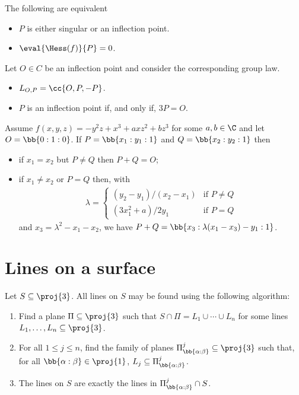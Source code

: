 \documentclass{article}
\begin{document}
\begin{lemma}
  The following are equivalent
  \begin{itemize}
    \item $P$ is either singular or an inflection point.
    \item $\eval{\Hess(f)}{P} = 0$.
  \end{itemize}
\end{lemma}

\begin{lemma}
  Let $O\in C$ be an inflection point and consider the corresponding
  group law.
  \begin{itemize}
    \item $L_{O,P} = \cc{O,P,-P}$.
    \item $P$ is an inflection point if, and only if, $3P=O$.
  \end{itemize}
\end{lemma}

\begin{lemma}
  Assume $f(x,y,z) = -y^2z + x^3 + axz^2 + bz^3$ for some $a,b\in\C$
  and let $O=\bb{0:1:0}$. If $P=\bb{x_1:y_1:1}$ and $Q=\bb{x_2:y_2:1}$
  then
  \begin{itemize}
    \item if $x_1=x_2$ but $P\neq Q$ then $P+Q=O$;
    \item if $x_1\neq x_2$ or $P=Q$ then, with
      \begin{align*}
        \lambda = \begin{cases}
          (y_2-y_1)/(x_2-x_1) & \text{if $P\neq Q$} \\
          (3x_1^2 + a)/2y_1 & \text{if $P=Q$}
        \end{cases}
      \end{align*}
      and $x_3 = \lambda^2 - x_1 - x_2$,  we have
      $P+Q = \bb{x_3 : \lambda(x_1 - x_3) - y_1 : 1}$.
  \end{itemize}
\end{lemma}

\section{Lines on a surface}

\begin{theorem}
  Let $S\subseteq\proj{3}$. All lines on $S$ may be found using the
  following algorithm:
  \begin{enumerate}
    \item Find a plane $\Pi\subseteq\proj{3}$ such that
      $S\cap\Pi = L_1\cup\cdots\cup L_n$ for some lines $L_1,\ldots,L_n
      \subseteq\proj{3}$.
    \item For all $1\leq j\leq n$, find the family of planes
      $\Pi^j_{\bb{\alpha:\beta}}\subseteq\proj{3}$ such that,
      for all $\bb{\alpha:\beta}\in\proj{1}$,
      $L_j\subseteq\Pi^j_{\bb{\alpha:\beta}}$.
    \item The lines on $S$ are exactly the lines in
      $\Pi^j_{\bb{\alpha:\beta}}\cap S$.
  \end{enumerate}
\end{theorem}
\end{document}
